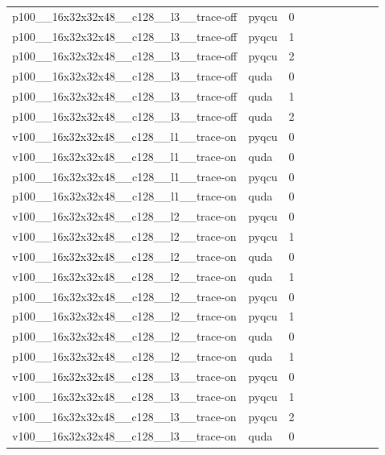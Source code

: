 \begin{table}[htbp]
\begin{tabular}{@{}llrrrrrrrr@{}}
p100\_\_16x32x32x48\_\_c128\_\_l3\_\_trace-off & pyqcu & 0 &  &  &  &  &  &  &  \\
p100\_\_16x32x32x48\_\_c128\_\_l3\_\_trace-off & pyqcu & 1 &  &  &  &  &  &  &  \\
p100\_\_16x32x32x48\_\_c128\_\_l3\_\_trace-off & pyqcu & 2 &  &  &  &  &  &  &  \\
p100\_\_16x32x32x48\_\_c128\_\_l3\_\_trace-off & quda & 0 &  &  &  &  &  &  &  \\
p100\_\_16x32x32x48\_\_c128\_\_l3\_\_trace-off & quda & 1 &  &  &  &  &  &  &  \\
p100\_\_16x32x32x48\_\_c128\_\_l3\_\_trace-off & quda & 2 &  &  &  &  &  &  &  \\
v100\_\_16x32x32x48\_\_c128\_\_l1\_\_trace-on & pyqcu & 0 &  &  &  &  &  &  &  \\
v100\_\_16x32x32x48\_\_c128\_\_l1\_\_trace-on & quda & 0 &  &  &  &  &  &  &  \\
p100\_\_16x32x32x48\_\_c128\_\_l1\_\_trace-on & pyqcu & 0 &  &  &  &  &  &  &  \\
p100\_\_16x32x32x48\_\_c128\_\_l1\_\_trace-on & quda & 0 &  &  &  &  &  &  &  \\
v100\_\_16x32x32x48\_\_c128\_\_l2\_\_trace-on & pyqcu & 0 &  &  &  &  &  &  &  \\
v100\_\_16x32x32x48\_\_c128\_\_l2\_\_trace-on & pyqcu & 1 &  &  &  &  &  &  &  \\
v100\_\_16x32x32x48\_\_c128\_\_l2\_\_trace-on & quda & 0 &  &  &  &  &  &  &  \\
v100\_\_16x32x32x48\_\_c128\_\_l2\_\_trace-on & quda & 1 &  &  &  &  &  &  &  \\
p100\_\_16x32x32x48\_\_c128\_\_l2\_\_trace-on & pyqcu & 0 &  &  &  &  &  &  &  \\
p100\_\_16x32x32x48\_\_c128\_\_l2\_\_trace-on & pyqcu & 1 &  &  &  &  &  &  &  \\
p100\_\_16x32x32x48\_\_c128\_\_l2\_\_trace-on & quda & 0 &  &  &  &  &  &  &  \\
p100\_\_16x32x32x48\_\_c128\_\_l2\_\_trace-on & quda & 1 &  &  &  &  &  &  &  \\
v100\_\_16x32x32x48\_\_c128\_\_l3\_\_trace-on & pyqcu & 0 &  &  &  &  &  &  &  \\
v100\_\_16x32x32x48\_\_c128\_\_l3\_\_trace-on & pyqcu & 1 &  &  &  &  &  &  &  \\
v100\_\_16x32x32x48\_\_c128\_\_l3\_\_trace-on & pyqcu & 2 &  &  &  &  &  &  &  \\
v100\_\_16x32x32x48\_\_c128\_\_l3\_\_trace-on & quda & 0 &  &  &  &  &  &  &  \\

\end{tabular}
\end{table}
